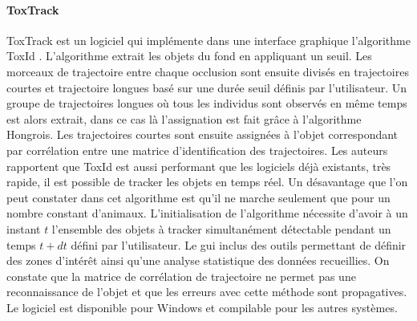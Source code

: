   \paragraph{ToxTrack}
  ToxTrack \cite{rodriguez2018toxtrac} est un logiciel qui implémente dans une interface graphique l'algorithme ToxId \cite{rodriguez2017toxid}. L’algorithme extrait les objets du fond en appliquant un seuil. Les morceaux de trajectoire entre chaque occlusion sont ensuite divisés en trajectoires courtes et trajectoire longues basé sur une durée seuil définis par l'utilisateur. Un groupe de trajectoires longues où tous les individus sont observés en même temps est alors extrait, dans ce cas là l'assignation est fait grâce à l'algorithme Hongrois. Les trajectoires courtes sont ensuite assignées à l'objet correspondant par corrélation entre une matrice d'identification des trajectoires.
  Les auteurs rapportent que ToxId est aussi performant que les logiciels déjà existants, très rapide, il est possible de tracker les objets en temps réel. Un désavantage que l'on peut constater dans cet algorithme est qu'il ne marche seulement que pour un nombre constant d'animaux. L'initialisation de l'algorithme nécessite d'avoir à un instant $t$ l'ensemble des objets à tracker simultanément détectable pendant un temps $t+dt$ défini par l'utilisateur. Le gui inclus des outils permettant de définir des zones d’intérêt ainsi qu'une analyse statistique des données recueillies. On constate que la matrice de corrélation de trajectoire ne permet pas une reconnaissance de l'objet et que les erreurs avec cette méthode sont propagatives. Le logiciel est disponible pour Windows et compilable pour les autres systèmes.

